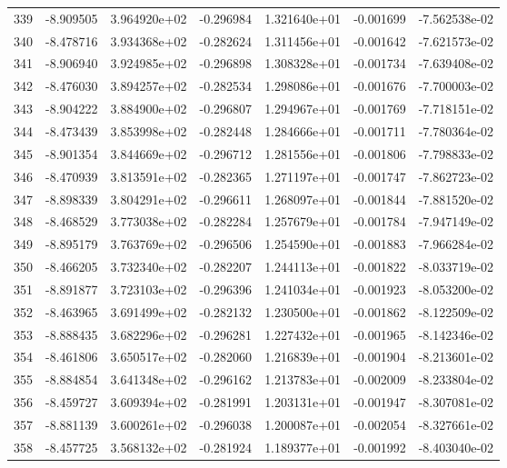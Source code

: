 \begin{tabular}{rrrrrrr}
 339 &  -8.909505 &  3.964920e+02 & -0.296984 &  1.321640e+01 &   -0.001699 & -7.562538e-02 \\
 340 &  -8.478716 &  3.934368e+02 & -0.282624 &  1.311456e+01 &   -0.001642 & -7.621573e-02 \\
 341 &  -8.906940 &  3.924985e+02 & -0.296898 &  1.308328e+01 &   -0.001734 & -7.639408e-02 \\
 342 &  -8.476030 &  3.894257e+02 & -0.282534 &  1.298086e+01 &   -0.001676 & -7.700003e-02 \\
 343 &  -8.904222 &  3.884900e+02 & -0.296807 &  1.294967e+01 &   -0.001769 & -7.718151e-02 \\
 344 &  -8.473439 &  3.853998e+02 & -0.282448 &  1.284666e+01 &   -0.001711 & -7.780364e-02 \\
 345 &  -8.901354 &  3.844669e+02 & -0.296712 &  1.281556e+01 &   -0.001806 & -7.798833e-02 \\
 346 &  -8.470939 &  3.813591e+02 & -0.282365 &  1.271197e+01 &   -0.001747 & -7.862723e-02 \\
 347 &  -8.898339 &  3.804291e+02 & -0.296611 &  1.268097e+01 &   -0.001844 & -7.881520e-02 \\
 348 &  -8.468529 &  3.773038e+02 & -0.282284 &  1.257679e+01 &   -0.001784 & -7.947149e-02 \\
 349 &  -8.895179 &  3.763769e+02 & -0.296506 &  1.254590e+01 &   -0.001883 & -7.966284e-02 \\
 350 &  -8.466205 &  3.732340e+02 & -0.282207 &  1.244113e+01 &   -0.001822 & -8.033719e-02 \\
 351 &  -8.891877 &  3.723103e+02 & -0.296396 &  1.241034e+01 &   -0.001923 & -8.053200e-02 \\
 352 &  -8.463965 &  3.691499e+02 & -0.282132 &  1.230500e+01 &   -0.001862 & -8.122509e-02 \\
 353 &  -8.888435 &  3.682296e+02 & -0.296281 &  1.227432e+01 &   -0.001965 & -8.142346e-02 \\
 354 &  -8.461806 &  3.650517e+02 & -0.282060 &  1.216839e+01 &   -0.001904 & -8.213601e-02 \\
 355 &  -8.884854 &  3.641348e+02 & -0.296162 &  1.213783e+01 &   -0.002009 & -8.233804e-02 \\
 356 &  -8.459727 &  3.609394e+02 & -0.281991 &  1.203131e+01 &   -0.001947 & -8.307081e-02 \\
 357 &  -8.881139 &  3.600261e+02 & -0.296038 &  1.200087e+01 &   -0.002054 & -8.327661e-02 \\
 358 &  -8.457725 &  3.568132e+02 & -0.281924 &  1.189377e+01 &   -0.001992 & -8.403040e-02 \\

\end{tabular}
